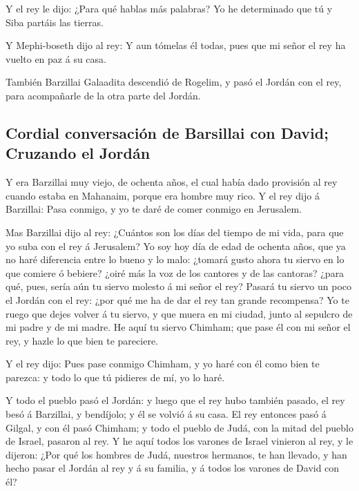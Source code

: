  Y el rey le dijo: ¿Para qué hablas más palabras? Yo he
determinado que tú y Siba partáis las tierras.

 Y Mephi-boseth dijo al rey: Y aun tómelas él todas, pues
que mi señor el rey ha vuelto en paz á su casa.

 También Barzillai Galaadita descendió de Rogelim, y pasó
el Jordán con el rey, para acompañarle de la otra parte del Jordán.

\hypertarget{cordial-conversaciuxf3n-de-barsillai-con-david-cruzando-el-jorduxe1n}{%
\subsection{Cordial conversación de Barsillai con David; Cruzando el
Jordán}\label{cordial-conversaciuxf3n-de-barsillai-con-david-cruzando-el-jorduxe1n}}

 Y era Barzillai muy viejo, de ochenta años, el cual
había dado provisión al rey cuando estaba en Mahanaim, porque era hombre
muy rico.  Y el rey dijo á Barzillai: Pasa conmigo, y yo
te daré de comer conmigo en Jerusalem.

 Mas Barzillai dijo al rey: ¿Cuántos son los días del
tiempo de mi vida, para que yo suba con el rey á Jerusalem?
 Yo soy hoy día de edad de ochenta años, que ya no haré
diferencia entre lo bueno y lo malo: ¿tomará gusto ahora tu siervo en lo
que comiere ó bebiere? ¿oiré más la voz de los cantores y de las
cantoras? ¿para qué, pues, sería aún tu siervo molesto á mi señor el
rey?  Pasará tu siervo un poco el Jordán con el rey: ¿por
qué me ha de dar el rey tan grande recompensa?  Yo te
ruego que dejes volver á tu siervo, y que muera en mi ciudad, junto al
sepulcro de mi padre y de mi madre. He aquí tu siervo Chimham; que pase
él con mi señor el rey, y hazle lo que bien te pareciere.

 Y el rey dijo: Pues pase conmigo Chimham, y yo haré con
él como bien te parezca: y todo lo que tú pidieres de mí, yo lo haré.

 Y todo el pueblo pasó el Jordán: y luego que el rey hubo
también pasado, el rey besó á Barzillai, y bendíjolo; y él se volvió á
su casa.  El rey entonces pasó á Gilgal, y con él pasó
Chimham; y todo el pueblo de Judá, con la mitad del pueblo de Israel,
pasaron al rey.  Y he aquí todos los varones de Israel
vinieron al rey, y le dijeron: ¿Por qué los hombres de Judá, nuestros
hermanos, te han llevado, y han hecho pasar el Jordán al rey y á su
familia, y á todos los varones de David con él?

